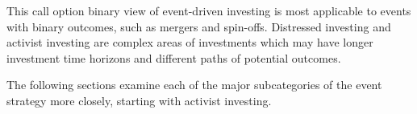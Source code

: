 \documentclass[11pt]{article}
\begin{document}
This call option binary view of event-driven investing is most applicable to events with binary outcomes, such as mergers and spin-offs. Distressed investing and activist investing are complex areas of investments which may have longer investment time horizons and different paths of potential outcomes.

The following sections examine each of the major subcategories of the event strategy more closely, starting with activist investing.
\end{document}
